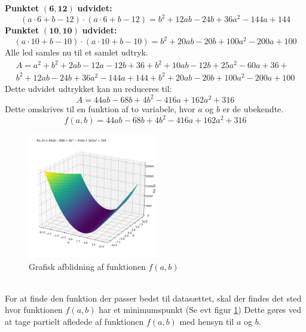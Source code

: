 \textbf{Punktet}   $\mathbf{(6,12)}$ \textbf{udvidet:}
\begin{equation*}
    (a \cdot 6 + b - 12) \cdot (a \cdot 6 + b - 12) = b^2 + 12ab - 24b + 36a^2 - 144a + 144
\end{equation*}
\textbf{Punktet}   $\mathbf{(10,10)}$ \textbf{udvidet:}
\begin{equation*}
    (a \cdot 10 + b - 10) \cdot (a \cdot 10 + b - 10) = b^2 + 20ab - 20b + 100a^2 - 200a + 100
\end{equation*}
Alle led samles nu til et samlet udtryk. 
\begin{equation*}
    \begin{split}
    A = a^2 + b^2 + 2ab - 12a - 12b + 36 + b^2 + 10ab -12b + 25a^2 - 60a + 36 + \\ b^2 + 12ab - 24b + 36a^2 - 144a + 144 + b^2 + 20ab - 20b + 100a^2 - 200a + 100
\end{split}
\end{equation*}
Dette udvidet udtrykket kan nu reduceres til:
\begin{equation*}
    A = 44ab - 68b + 4b^2 - 416a + 162a^2 + 316
\end{equation*}
Dette omskrives til en funktion af to variabele, hvor $a$ og $b$ er de ubekendte. 
\begin{equation*}
   f(a,b) = 44ab - 68b + 4b^2 - 416a + 162a^2 + 316 
\end{equation*}
\begin{figure}[h!]
    \centering
    \includegraphics[width=0.5\textwidth]{figures/3dGraf.png}
    \caption{Grafisk afblidning af funktionen $f(a,b)$}
    \label{fig:grafiskAfbildningAfFunktionAfToVariable}
\end{figure} \\ 
For at finde den funktion der passer bedst til datasættet, skal der findes det sted hvor funktionen $f(a,b)$ har et minimumspunkt (Se evt figur \ref{fig:grafiskAfbildningAfFunktionAfToVariable}) Dette gøres ved at tage partielt afledede af funktionen $f(a,b)$ med hensyn til $a$ og $b$.  
